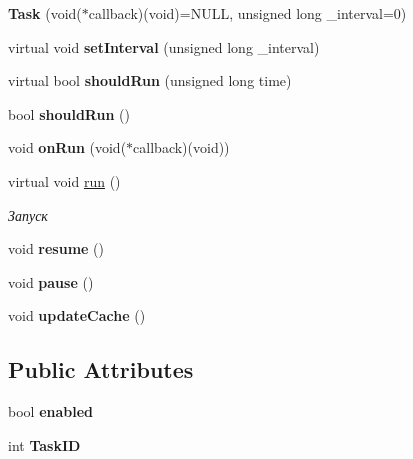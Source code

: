 \begin{DoxyCompactItemize}
\item 
\hypertarget{class_task_a8176da7a88e02377b57598c9a4409d74}{{\bfseries Task} (void($\ast$callback)(void)=N\-U\-L\-L, unsigned long \-\_\-interval=0)}\label{class_task_a8176da7a88e02377b57598c9a4409d74}

\item 
\hypertarget{class_task_a4988948f4115c37f1e7291282475301d}{virtual void {\bfseries set\-Interval} (unsigned long \-\_\-interval)}\label{class_task_a4988948f4115c37f1e7291282475301d}

\item 
\hypertarget{class_task_a4ba998243774e64e8b206e0648c94686}{virtual bool {\bfseries should\-Run} (unsigned long time)}\label{class_task_a4ba998243774e64e8b206e0648c94686}

\item 
\hypertarget{class_task_ad90f78a90f598e863077b319d532b498}{bool {\bfseries should\-Run} ()}\label{class_task_ad90f78a90f598e863077b319d532b498}

\item 
\hypertarget{class_task_a5601d9a37b0b7675dadfb0b4ee396937}{void {\bfseries on\-Run} (void($\ast$callback)(void))}\label{class_task_a5601d9a37b0b7675dadfb0b4ee396937}

\item 
\hypertarget{class_task_a034b41e0d81a3dc01804bbc3f73a25f2}{virtual void \hyperlink{class_task_a034b41e0d81a3dc01804bbc3f73a25f2}{run} ()}\label{class_task_a034b41e0d81a3dc01804bbc3f73a25f2}

\begin{DoxyCompactList}\small\item\em Запуск \end{DoxyCompactList}\item 
\hypertarget{class_task_a8fc7f3a2f5ebd910f22d1134d0dfcb2f}{void {\bfseries resume} ()}\label{class_task_a8fc7f3a2f5ebd910f22d1134d0dfcb2f}

\item 
\hypertarget{class_task_a495138236c4f8dbbf39accb50a225805}{void {\bfseries pause} ()}\label{class_task_a495138236c4f8dbbf39accb50a225805}

\item 
\hypertarget{class_task_a7d3567d532005b7d512a262c05ea7660}{void {\bfseries update\-Cache} ()}\label{class_task_a7d3567d532005b7d512a262c05ea7660}

\end{DoxyCompactItemize}
\subsection*{Public Attributes}
\begin{DoxyCompactItemize}
\item 
\hypertarget{class_task_ab8eae16bcc9a58902bfcb2d87aa2ca76}{bool {\bfseries enabled}}\label{class_task_ab8eae16bcc9a58902bfcb2d87aa2ca76}

\item 
\hypertarget{class_task_a718368e89530280279009e82295cd162}{int {\bfseries Task\-I\-D}}\label{class_task_a718368e89530280279009e82295cd162}

\end{DoxyCompactItemize}

